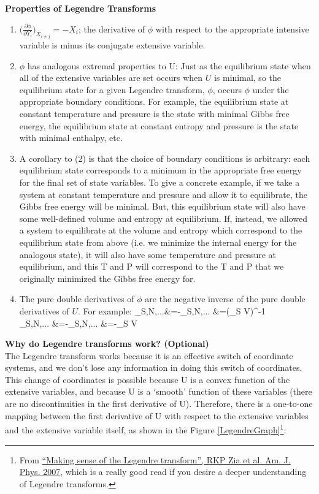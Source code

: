 \documentclass[12pt]{article}
\begin{document}
\textbf{Properties of Legendre Transforms}\\
\begin{enumerate}
\item $\Big(\frac{\partial \phi}{\partial Y_i}\Big)_{X_{i\neq j}}=-X_i$; the derivative of $\phi$ with respect to the appropriate intensive variable is minus its conjugate extensive variable.
\item $\phi$ has analogous extremal properties to U: Just as the equilibrium state when all of the extensive variables are set occurs when $U$ is minimal, so the equilibrium state for a given Legendre transform, $\phi$, occurs $\phi$ under the appropriate boundary conditions. For example, the equilibrium state at constant temperature and pressure is the state with minimal Gibbs free energy, the equilibrium state at constant entropy and pressure is the state with minimal enthalpy, etc. 
\item A corollary to (2) is that the choice of boundary conditions is arbitrary: each equilibrium state corresponds to a minimum in the appropriate free energy for the final set of state variables. To give a concrete example, if we take a system at constant temperature and pressure and allow it to equilibrate, the Gibbs free energy will be minimal. But, this equilibrium state will also have some well-defined volume and entropy at equilibrium. If, instead, we allowed a system to equilibrate at the volume and entropy which correspond to the equilibrium state from above (i.e. we minimize the internal energy for the analogous state), it will also have some temperature and pressure at equilibrium, and this T and P will correspond to the T and P that we originally minimized the Gibbs free energy for.
\item The pure double derivatives of $\phi$ are the negative inverse of the pure double derivatives of $U$. For example:
 \eqs {}_{S,N,...}&=-_{S,N,...} &=(\beta_S V)^{-1}\\
 _{S,N,...} &=-_{S,N,...} &=-\beta_S V \eqe
\end{enumerate}

\textbf{Why do Legendre transforms work? (Optional)}\\
The Legendre transform works because it is an effective switch of coordinate systems, and we don't lose any information in doing this switch of coordinates. This change of coordinates is possible because U is a convex function of the extensive variables, and because U is a `smooth' function of these variables (there are no discontinuities in the first derivative of U). Therefore, there is a one-to-one mapping between the first derivative of U with respect to the extensive variables and the extensive variable itself, as shown in the Figure \ref{LegendreGraph}\footnote{From \href{http://dx.doi.org/10.1119/1.3119512}{``Making sense of the Legendre transform'', RKP Zia et al. Am. J. Phys. 2007}, which is a really good read if you desire a deeper understanding of Legendre transforms.}:
\end{document}
